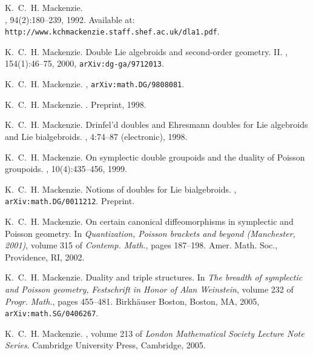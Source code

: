 \documentclass[12pt,reqno,a4paper]{amsart}
\theoremstyle{definition}
\begin{document}
\begin{thebibliography}{10}
{K.~C.~H. Mackenzie.}
\\
, 94(2):180--239, 1992.
\newblock Available at:\\
  \texttt{http://www.kchmackenzie.staff.shef.ac.uk/dla1.pdf}.

K.~C.~H. Mackenzie.
\newblock Double {L}ie algebroids and second-order geometry. {II}.
, 154(1):46--75, 2000, \texttt{arXiv:dg-ga/9712013}.

K.~C.~H. Mackenzie.
,
  \texttt{arXiv:math.DG/9808081}.

K.~C.~H. Mackenzie.
.
\newblock Preprint, 1998.

K.~C.~H. Mackenzie.
\newblock Drinfel{'}d doubles and {E}hresmann doubles for {L}ie algebroids
  and {L}ie bialgebroids.
, 4:74--87
  (electronic), 1998.

K.~C.~H. Mackenzie.
\newblock On symplectic double groupoids and the duality of {P}oisson
  groupoids.
, 10(4):435--456, 1999.

K.~C.~H. Mackenzie.
\newblock Notions of doubles for {Lie} bialgebroids.
, \texttt{arXiv:math.DG/0011212}.
\newblock Preprint.

K.~C.~H. Mackenzie.
\newblock On certain canonical diffeomorphisms in symplectic and {P}oisson
  geometry.
\newblock In {\em Quantization, Poisson brackets and beyond (Manchester,
  2001)}, volume 315 of {\em Contemp. Math.}, pages 187--198. Amer. Math. Soc.,
  Providence, RI, 2002.

K.~C.~H. Mackenzie.
\newblock Duality and triple structures.
\newblock In {\em The breadth of symplectic and Poisson geometry, Festschrift
  in Honor of Alan Weinstein}, volume 232 of {\em Progr. Math.}, pages
  455--481. Birkh\"auser Boston, Boston, MA, 2005,
  \texttt{arXiv:math.SG/0406267}.

K.~C.~H. Mackenzie.
, volume
  213 of {\em London Mathematical Society Lecture Note Series}.
\newblock Cambridge University Press, Cambridge, 2005.


\end{thebibliography}
\end{document}
